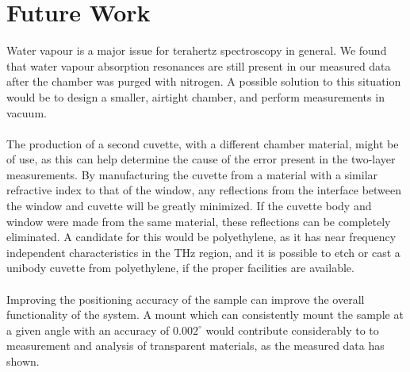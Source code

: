 \section{Future Work}
\label{sec: Future}

Water vapour is a major issue for terahertz spectroscopy in general. We found that water vapour absorption resonances are still present in our measured data after the chamber was purged with nitrogen. A possible solution to this situation would be to design a smaller, airtight chamber, and perform measurements in vacuum.
\paragraph{}
The production of a second cuvette, with a different chamber material, might be of use, as this can help determine the cause of the error present in the two-layer measurements. By manufacturing the cuvette from a material with a similar refractive index to that of the window, any reflections from the interface between the window and cuvette will be greatly minimized. If the cuvette body and window were made from the same material, these reflections can be completely eliminated. A candidate for this would be polyethylene, as it has near frequency independent characteristics in the THz region, and it is possible to etch or cast a unibody cuvette from polyethylene, if the proper facilities are available.
\paragraph{}
Improving the positioning accuracy of the sample can improve the overall functionality of the system. A mount which can consistently mount the sample at a given angle with an accuracy of $0.002^{\circ}$ would contribute considerably to to measurement and analysis of transparent materials, as the measured data has shown.
